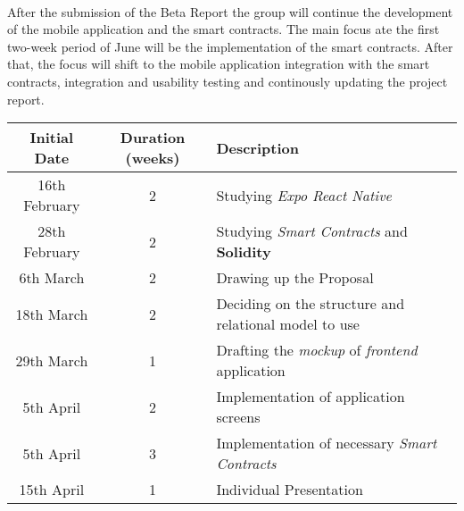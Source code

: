 \paragraph{}

After the submission of the Beta Report the group will continue the development of the mobile application and the smart contracts.
The main focus ate the first two-week period of June will be the implementation of the smart contracts. After that, the focus will shift to the mobile application
integration with the smart contracts, integration and usability testing and continously updating the project report.

\begin{table}[h]\label{tab:work-plan}
    \centering
    \begin{tabular}{|c|c|p{8cm}|}
        \hline
        \textbf{Initial Date} & \textbf{Duration (weeks)} & \textbf{Description}                                                               \\
        \hline
        16th February         & 2                         & Studying \textit{Expo React Native}                                                \\
        \hline
        28th February         & 2                         & Studying \textit{Smart Contracts} and \textbf{Solidity}                            \\
        \hline
        6th March             & 2                         & Drawing up the Proposal                                                            \\
        \hline
        18th March            & 2                         & Deciding on the structure and relational model to use                              \\
        \hline
        29th March            & 1                         & Drafting the \textit{mockup} of \textit{frontend} application                      \\
        \hline
        5th April             & 2                         & Implementation of application screens                                              \\
        \hline
        5th April             & 3                         & Implementation of necessary \textit{Smart Contracts}                               \\
        \hline
        15th April            & 1                         & Individual Presentation                                                            \\

\end{tabular}
\end{table}
